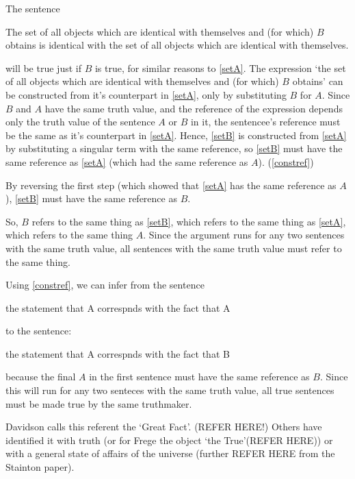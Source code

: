 The sentence 

	\begin{example} \label{setB}
	The set of all objects which are identical with themselves and (for which) $B$ obtains is identical with the set of all objects which are identical with themselves.
	\end{example}

will be true just if $B$ is true, for similar reasons to \ref{setA}.
The expression `the set of all objects which are identical with themselves and (for which) $B$ obtains' can be constructed from it's counterpart in \ref{setA}, only by substituting $B$ for $A$.
Since $B$ and $A$ have the same truth value, and the reference of the expression depends only the truth value of the sentence $A$ or $B$ in it, the sentencee's reference must be the same as it's counterpart in \ref{setA}.
Hence, \ref{setB} is constructed from \ref{setA} by substituting a singular term with the same reference, so \ref{setB} must have the same reference as \ref{setA} (which had the same reference as $A$). 
(\ref{constref})

By reversing the first step (which showed that \ref{setA} has the same reference as $A$), \ref{setB} must have the same reference as $B$.

So, $B$ refers to the same thing as \ref{setB}, which refers to the same thing as \ref{setA}, which refers to the same thing $A$.
Since the argument runs for any two sentences with the same truth value, all sentences with the same truth value must refer to the same thing.

Using \ref{constref}, we can infer from the sentence

	\begin{example} \label{stateA}
	the statement that A correspnds with the fact that A
	\end{example}

to the sentence:

	\begin{example} \label{stateA}
	the statement that A correspnds with the fact that B
	\end{example}

because the final $A$ in the first sentence must have the same reference as $B$.
Since this will run for any two senteces with the same truth value, all true sentences must be made true by the same truthmaker.

Davidson calls this referent the `Great Fact'. (REFER HERE!) Others have identified it with truth (or for Frege the object `the True'(REFER HERE)) or with a general state of affairs of the universe (further REFER HERE from the Stainton paper).

